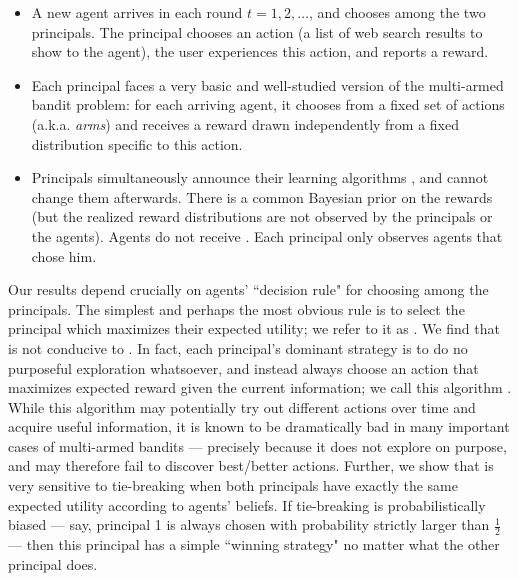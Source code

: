 \begin{itemize}

\item A new agent arrives in each round $t=1,2, \ldots$, and chooses among the two principals. The principal chooses an action (\eg a list of web search results to show to the agent), the user experiences this action, and reports a reward. 

\item Each principal faces a very basic and well-studied version of the multi-armed bandit problem: for each arriving agent, it chooses from a fixed set of actions  (a.k.a. \emph{arms}) and receives a reward drawn independently from a fixed distribution specific to this action.

\item Principals simultaneously announce their learning algorithms , and cannot change them afterwards. There is a common Bayesian prior on the rewards (but the realized reward distributions are not observed by the principals or the agents). Agents do not receive . Each principal only observes agents that chose him.
\end{itemize}

Our results depend crucially on agents' ``decision rule" for choosing among the principals. The simplest and perhaps the most obvious rule is to select the principal which maximizes their expected utility; we refer to it as \HardMax. We find that \HardMax is not conducive to . In fact, each principal's dominant strategy is to do no purposeful exploration whatsoever, and instead always choose an action that maximizes expected reward given the current information; we call this algorithm \DynGreedy. While this algorithm may potentially try out different actions over time and acquire useful information, it is known to be dramatically bad in many important cases of multi-armed bandits --- precisely because it does not explore on purpose, and may therefore fail to discover best/better actions. Further, we show that \HardMax is very sensitive to tie-breaking when both principals have exactly the same expected utility according to agents' beliefs. If tie-breaking is probabilistically biased --- say, principal 1 is always chosen with probability strictly larger than $\tfrac12$ --- then this principal has a simple ``winning strategy" no matter what the other principal does.

